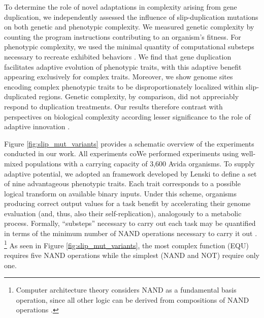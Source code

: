 To determine the role of novel adaptations in complexity arising from gene duplication, we independently assessed the influence of slip-duplication mutations on both genetic and phenotypic complexity.
We measured genetic complexity by counting the program instructions contributing to an organism's fitness.
For phenotypic complexity, we used the minimal quantity of computational substeps necessary to recreate exhibited behaviors \citet{Lenski2003Evolutionary}.
We find that gene duplication facilitates adaptive evolution of phenotypic traits, with this adaptive benefit appearing exclusively for complex traits.
Moreover, we show genome sites encoding complex phenotypic traits to be disproportionately localized within slip-duplicated regions.
Genetic complexity, by comparison, did not appreciably respond to duplication treatments.
Our results therefore contrast with perspectives on biological complexity according lesser significance to the role of adaptive innovation \citep{Lynch2000,Beslon2021,Lynch2007}.

Figure \ref{fig:slip_mut_variants} provides a schematic overview of the experiments conducted in our work.
All experiments coWe performed experiments using well-mixed populations with a carrying capacity of 3,600 Avida organisms.
To supply adaptive potential, we adopted an framework developed by Lenski \citet{Lenski2003Evolutionary} to define a set of nine advantageous phenotypic traits.
Each trait corresponds to a possible logical transform on available binary inputs.
Under this scheme, organisms producing correct output values for a task benefit by accelerating their genome evaluation (and, thus, also their self-replication), analogously to a metabolic process.
Formally, ``substeps'' necessary to carry out each task may be quantified in terms of the minimum number of NAND operations necessary to carry it out \citep{Lenski2003Evolutionary}.%
\footnote{
Computer architecture theory considers NAND as a fundamental basis operation, since all other logic can be derived from compositions of NAND operations \citep{mano1997logic}.
}
As seen in Figure \ref{fig:slip_mut_variants}, the most complex function (EQU) requires five NAND operations while the simplest (NAND and NOT) require only one.

